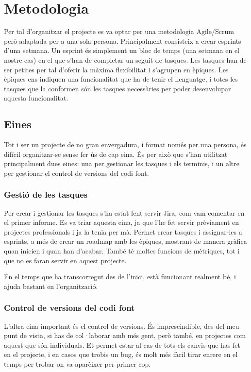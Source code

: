 ﻿\documentclass{article}
\begin{document}
\section{Metodologia}
Per tal d'organitzar el projecte es va optar per una metodologia Agile/Scrum
però adaptada per a una sola persona. Principalment consisteix a crear esprints
d'una setmana. Un esprint és simplement un bloc de temps (una setmana en el
nostre cas) en el que s'han de completar un seguit de tasques. Les tasques han
de ser petites per tal d'oferir la màxima flexibilitat i s'agrupen en èpiques.
Les èpiques ens indiquen una funcionalitat que ha de tenir el llenguatge, i
totes les tasques que la conformen són les tasques necessàries per poder
desenvolupar aquesta funcionalitat.

\subsection{Eines}
Tot i ser un projecte de no gran envergadura, i format només per una persona, és
difícil organitzar-se sense fer ús de cap eina. És per això que s'han utilitzat
principalment dues eines: una per gestionar les tasques i els terminis, i un
altre per gestionar el control de versions del codi font.

\subsubsection{Gestió de les tasques} Per crear i gestionar les tasques s'ha
estat fent servir Jira, com vam comentar en el primer informe. Es va triar
aquesta eina, ja que l'he fet servir prèviament en projectes professionals i ja
la tenia per mà. Permet crear tasques i assignar-les a esprints, a més de crear
un roadmap amb les èpiques, mostrant de manera gràfica quan inicien i quan han
d'acabar. També té moltes funcions de mètriques, tot i que no es faran servir en
aquest projecte.

En el temps que ha transcorregut des de l'inici, està funcionant realment bé, i
ajuda bastant en l'organització.

\subsubsection{Control de versions del codi font} L'altra eina important és el
control de versions. És imprescindible, des del meu punt de vista, si has de
col·laborar amb més gent, però també, en projectes com aquest que són
individuals. Et permet estar al cas de tots els canvis que has fet en el
projecte, i en casos que trobis un bug, és molt més fàcil tirar enrere en el
temps per trobar on va aparèixer per primer cop.
\end{document}

